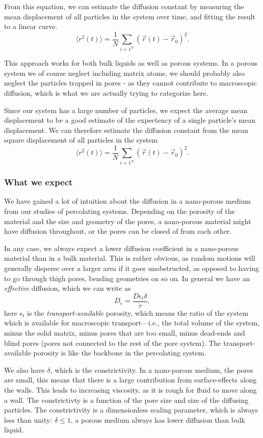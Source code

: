 \documentclass[a4paper, 11pt, notitlepage, english]{article}
\newcommand{\eps}{\epsilon}
\begin{document}
From this equation, we can estimate the diffusion constant by measuring the mean displacement of all particles in the system over time, and fitting the result to a linear curve.
$$\langle r^2(t) \rangle = \frac{1}{N}\sum_{i=1^N} (\vec{r}(t) - \vec{r}_{0})^2.$$

This approach works for both bulk liquids as well as porous systems. In a porous system we of course neglect including matrix atoms, we should probably also neglect the particles trapped in pores - as they cannot contribute to macroscopic diffusion, which is what we are actually trying to categorize here.

Since our system has a large number of particles, we expect the average mean displacement to be a good estimate of the expectency of a single particle's mean displacement. We can therefore estimate the diffusion constant from the mean square displacement of all particles in the system
$$\langle r^2(t) \rangle = \frac{1}{N}\sum_{i=1^N} (\vec{r}(t) - \vec{r}_{0})^2.$$

\subsubsection*{What we expect}

We have gained a lot of intuition about the diffusion in a nano-porous medium from our studies of percolating systems. Depending on the porosity of the material and the size and geometry of the pores, a nano-porous material might have diffusion throughout, or the pores can be closed of from each other.

In any case, we always expect a lower diffusion coefficient in a nano-porous material than in a bulk material. This is rather obvious, as random motions will generally disperse over a larger area if it goes unobstructed, as opposed to having to go through thigh pores, bending geometries on so on. In general we have an \emph{effective} diffusion, which we can write as
$$D_e = \frac{D \eps_t \delta}{\tau},$$
here $\eps_t$ is the \emph{transport-available} porosity, which means the ratio of the system which is available for macroscopic transport---i.e., the total volume of the system, minus the solid matrix, minus pores that are too small, minus dead-ends and blind pores (pores not connected to the rest of the pore system). The transport-available porosity is like the backbone in the percolating system. 

We also have $\delta$, which is the constrictivity. In a nano-porous medium, the pores are small, this means that there is a large contribution from surface-effects along the walls. This leads to increasing viscosity, as it is rough for fluid to move along a wall. The constrictivty is a function of the pore size and size of the diffusing particles. The constrictivity is a dimensionless scaling parameter, which is always less than unity: $\delta \leq 1$, a porous medium always has lower diffusion than bulk liquid.
\end{document}
